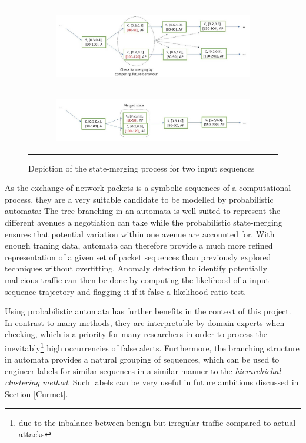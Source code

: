 \documentclass[a4paper,12pt,twoside]{report}
\begin{document}
\begin{figure}
\centering
\begin{tabular}{c}
\begin{subfigure}[b]{0.85\textwidth}\label{Autotrie}
\includegraphics[width=\textwidth]{images/Autotrie.jpg}
\caption{}
\end{subfigure}\\
\begin{subfigure}[b]{0.85\textwidth}\label{Automerge}
\includegraphics[width=\textwidth]{images/Automerge.jpg}
\caption{}
\end{subfigure}
\end{tabular}
\caption{Depiction of the state-merging process for two input sequences}\label{Autt}
\end{figure}

As the exchange of network packets is a symbolic sequences of a computational process, they are a very suitable candidate to be modelled by probabilistic automata: The tree-branching in an automata is well suited to represent the different avenues a negotiation can take while the probabilistic state-merging ensures that potential variation within one avenue are accounted for. With enough traning data, automata can therefore provide a much more refined representation of a given set of packet sequences than previously explored techniques without overfitting. Anomaly detection to identify potentially malicious traffic can then be done by computing the likelihood of a input sequence trajectory and flagging it if it false a likelihood-ratio test. 

Using probabilistic automata has further benefits in the context of this project. In contrast to many methods, they are interpretable by domain experts when checking, which is a priority for many researchers in order to process the inevitably\footnote{due to the inbalance between benign but irregular traffic compared to actual attacks} high occurrencies of false alerts. Furthermore, the branching structure in automata provides a natural grouping of sequences, which can be used to engineer labels for similar sequences in a similar manner to the \textit{hierarchichal clustering method}. Such labels can be very useful in future ambitions discussed in Section \ref{Curmet}.
\end{document}
